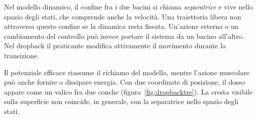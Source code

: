 \documentclass[11pt,a4paper,twoside=false,headinclude,footinclude]{scrartcl}
\begin{document}
Nel modello dinamico, il confine fra i due bacini si chiama \emph{separatrice} e vive nello spazio degli stati, che comprende anche la velocità. Una traiettoria libera non attraversa questo confine se la dinamica resta fissata. Un'azione esterna o un cambiamento del controllo può invece portare il sistema da un bacino all'altro. Nel dropback il praticante modifica attivamente il movimento durante la transizione.

Il potenziale efficace riassume il richiamo del modello, mentre l'azione muscolare può anche fornire o dissipare energia. Con due coordinate di posizione, il dosso appare come un valico fra due conche (figura~\ref{fig:dropbacktre}). La cresta visibile sulla superficie non coincide, in generale, con la separatrice nello spazio degli stati.

\begin{figure}[htbp]
\centering
{}
\end{figure}
\end{document}
